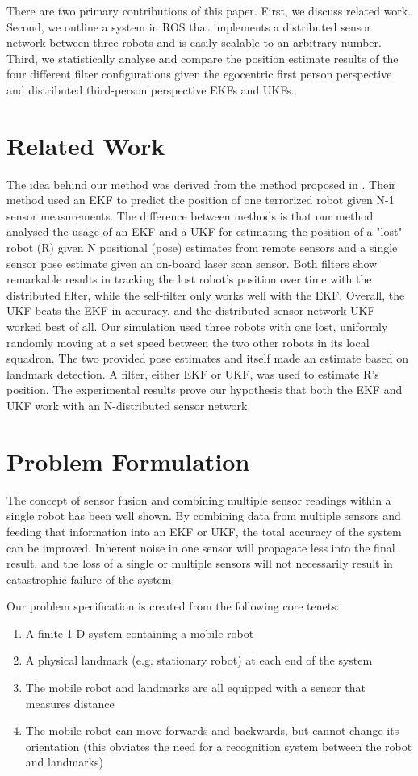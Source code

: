 \documentclass[conference]{IEEEtran} \usepackage[T1]{fontenc} \usepackage[backend=biber, style=ieee]{biblatex}
\begin{document}
There are two primary contributions of this paper. First, we discuss related work. Second, we outline a system in ROS that implements a distributed sensor network 
between three robots and is easily scalable to an arbitrary number. Third, we statistically analyse and compare the position estimate results of the four different 
filter configurations given the egocentric first person perspective and distributed third-person perspective EKFs and UKFs.

\section{Related Work} \label{Related Work}
The idea behind our method was derived from the method proposed in \cite{bezzo2014attack}. Their method used an EKF to predict the position
of one terrorized robot given N-1 sensor measurements. The difference between methods is that our method analysed the
usage of an EKF and a UKF for estimating the position of a "lost" robot (R) given N positional (pose) estimates from remote
sensors and a single sensor pose estimate given an on-board laser scan sensor. Both filters show remarkable results in tracking 
the lost robot's position over time with the distributed filter, while the self-filter only works well with the EKF. Overall, 
the UKF beats the EKF in accuracy, and the distributed sensor network UKF worked best of all. Our simulation used three robots 
with one lost, uniformly randomly moving at a set speed between the two other robots in its local squadron. The two provided 
pose estimates and itself made an estimate based on landmark detection. A filter, either EKF or UKF, was used to estimate R's 
position. The experimental results prove our hypothesis that both the EKF and UKF work with an N-distributed sensor network.


\section{Problem Formulation} \label{Problem Formulation}
The concept of sensor fusion and combining multiple sensor readings within a single robot has been well shown. By
combining data from multiple sensors and feeding that information into an EKF or UKF, the total accuracy of the system
can be improved. Inherent noise in one sensor will propagate less into the final result, and the loss of a single or
multiple sensors will not necessarily result in catastrophic failure of the system.

Our problem specification is created from the following core tenets:
\begin{enumerate} 
\item A finite 1-D system containing a mobile robot 
\item A physical landmark (e.g. stationary robot) at each end of the system
\item The mobile robot and landmarks are all equipped with a sensor that measures distance 
\item The mobile robot can move forwards and backwards, but cannot change its orientation (this obviates the need for a 
recognition system between the robot and landmarks)
\end{enumerate}
\end{document}
